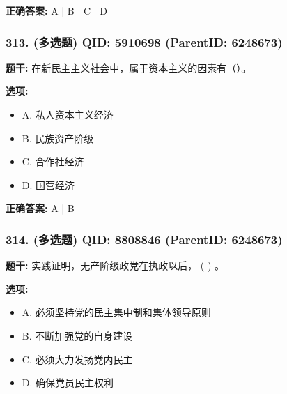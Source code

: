 \documentclass[12pt,UTF8]{ctexart}
\begin{document}
\textbf{正确答案:}
A | B | C | D

\vspace{0.3em}\hrulefill\vspace{0.7em}

\subsubsection*{313. (多选题) \small QID: 5910698 (ParentID: 6248673)}

\textbf{题干:}
在新民主主义社会中，属于资本主义的因素有（）。



\textbf{选项:}
\begin{itemize}[leftmargin=*]

  \item A. 私人资本主义经济

  \item B. 民族资产阶级

  \item C. 合作社经济

  \item D. 国营经济

\end{itemize}

\textbf{正确答案:}
A | B

\vspace{0.3em}\hrulefill\vspace{0.7em}

\subsubsection*{314. (多选题) \small QID: 8808846 (ParentID: 6248673)}

\textbf{题干:}
实践证明，无产阶级政党在执政以后， ( ) 。



\textbf{选项:}
\begin{itemize}[leftmargin=*]

  \item A. 必须坚持党的民主集中制和集体领导原则

  \item B. 不断加强党的自身建设

  \item C. 必须大力发扬党内民主

  \item D. 确保党员民主权利

\end{itemize}
\end{document}
